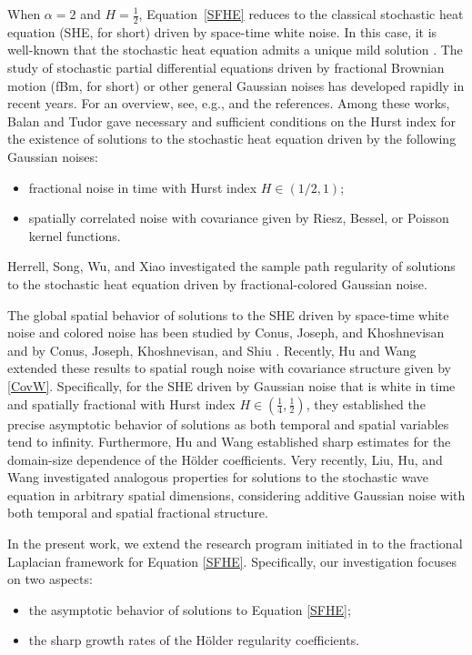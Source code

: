 \documentclass[11pt,reqno]{amsart}
\numberwithin{equation}{section}
\newcommand{\1}{{\bf 1}}
\newcommand{\2}{{\bf 2}}
\begin{document}
When $\alpha=2$ and $H=\frac{1}{2}$, Equation~\eqref{SFHE} reduces to the classical stochastic heat equation (SHE, for short) driven by space-time white noise. In this case, it is well-known that the stochastic heat equation admits a unique mild solution \cite{D1999,Walsh1986}.  
The study of stochastic partial differential equations  driven by fractional Brownian motion (fBm, for short) or other general Gaussian noises   has developed rapidly in recent years. For an overview, see, e.g., \cite{BT2008,HJQ19,HLT2019,LHW2022,LHW2023,LM22,T2014,B.RM2012,GSS24} and the references.
Among these works, Balan and Tudor \cite{BT2008} gave necessary and sufficient conditions on the Hurst index for the existence of solutions to the stochastic heat equation driven by the following Gaussian noises:
\begin{itemize}
\item fractional noise in time with Hurst index $H \in (1/2,1)$;
\item spatially correlated noise with covariance given by Riesz, Bessel, or Poisson kernel functions.
\end{itemize}
Herrell, Song, Wu, and Xiao \cite{HSWX2020} investigated the sample path regularity of solutions to the stochastic heat equation driven by fractional-colored Gaussian noise.



The global spatial behavior of  solutions to the SHE driven by space-time white noise and colored noise
has been studied by  Conus, Joseph, and Khoshnevisan  \cite[Theorem 1.2]{CJK2013} and by Conus, Joseph, Khoshnevisan, and Shiu   \cite[Theorem 2.3]{CJKS2013}. Recently, Hu and Wang \cite{HW2022} extended these results to spatial rough noise with covariance structure given by \eqref{CovW}. Specifically, for the SHE driven by Gaussian noise that is white in time and spatially fractional with Hurst index $H \in (\frac{1}{4}, \frac{1}{2})$, they established the  precise asymptotic behavior of solutions as both temporal and spatial variables tend to infinity. Furthermore, Hu and Wang \cite{HW2022} established sharp estimates for the domain-size dependence of the H\"older coefficients. Very recently, Liu, Hu, and Wang \cite{LHW2023} investigated analogous properties for solutions to the stochastic wave equation in arbitrary spatial dimensions, considering additive Gaussian noise with both temporal and spatial fractional structure.


In the present work, we extend the research program initiated in \cite{HW2022} to the fractional Laplacian framework for Equation \eqref{SFHE}. Specifically, our investigation focuses on two  aspects:
\begin{itemize}
\item the asymptotic behavior of solutions to Equation \eqref{SFHE};
\item the sharp growth rates of the H\"older regularity coefficients.
\end{itemize}
\end{document}

